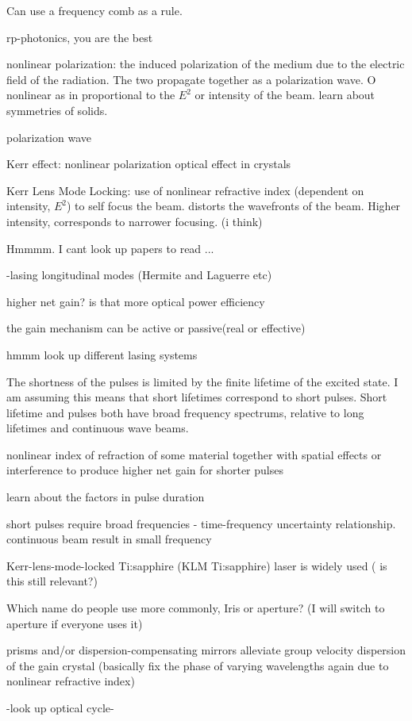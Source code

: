 \documentclass[11pt,a4paper]{book}
\begin{document}
Can use a frequency comb as a rule.

rp-photonics, you are the best

nonlinear polarization: the induced polarization of the medium due to the electric field of the radiation. The two propagate together as a polarization wave. O nonlinear as in proportional to the $E^2$ or intensity of the beam. learn about symmetries of solids.

polarization wave

Kerr effect: nonlinear polarization optical effect in crystals 

Kerr Lens Mode Locking: use of nonlinear refractive index (dependent on intensity, $E^2$) to self focus the beam. distorts the wavefronts of the beam. Higher intensity, corresponds to narrower focusing. (i think)

Hmmmm. I cant look up papers to read ...

-lasing longitudinal modes (Hermite and Laguerre etc)

higher net gain? is that more optical power efficiency

the gain mechanism can be active or passive(real or effective)

hmmm look up different lasing systems

The shortness of the pulses is limited by the finite lifetime of the excited state. I am assuming this means that short lifetimes correspond to short pulses. Short lifetime and pulses both have broad frequency spectrums, relative to long lifetimes and continuous wave beams.

nonlinear index of refraction of some material together with spatial effects or interference to produce higher net gain for shorter pulses

learn about the factors in pulse duration

short pulses require broad frequencies - time-frequency uncertainty relationship. continuous beam result in small frequency 

Kerr-lens-mode-locked Ti:sapphire (KLM Ti:sapphire) laser is widely used ( is this still relevant?) 

Which name do people use more commonly, Iris or aperture? (I will switch to aperture if everyone uses it)

prisms and/or dispersion-compensating mirrors alleviate group velocity dispersion of the gain crystal (basically fix the phase of varying wavelengths again due to nonlinear refractive index)

-look up optical cycle-
\end{document}

